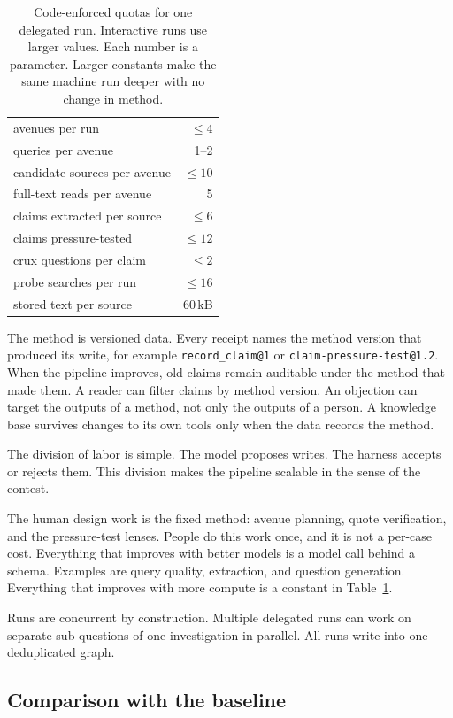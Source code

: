 \documentclass[10pt,twocolumn]{article}
\newcommand{\code}[1]{\texttt{\small #1}}
\begin{document}
\begin{table}[t]
\centering\small
\begin{tabular}{@{}lr@{}}
\toprule
avenues per run & $\leq 4$ \\
queries per avenue & 1--2 \\
candidate sources per avenue & $\leq 10$ \\
full-text reads per avenue & 5 \\
claims extracted per source & $\leq 6$ \\
claims pressure-tested & $\leq 12$ \\
crux questions per claim & $\leq 2$ \\
probe searches per run & $\leq 16$ \\
stored text per source & 60\,kB \\
\bottomrule
\end{tabular}
\caption{Code-enforced quotas for one delegated run. Interactive runs use
larger values. Each number is a parameter. Larger constants make the same
machine run deeper with no change in method.}
\label{tab:quotas}
\end{table}

The method is versioned data. Every receipt names the method version that
produced its write, for example \code{record\_claim@1} or
\code{claim-pressure-test@1.2}. When the pipeline improves, old claims
remain auditable under the method that made them. A reader can filter
claims by method version. An objection can target the outputs of a
method, not only the outputs of a person. A knowledge base survives
changes to its own tools only when the data records the method.

The division of labor is simple. The model proposes writes. The harness
accepts or rejects them. This division makes the pipeline scalable in the
sense of the contest.

The human design work is the fixed method: avenue planning, quote
verification, and the pressure-test lenses. People do this work once, and
it is not a per-case cost. Everything that improves with better models is
a model call behind a schema. Examples are query quality, extraction, and
question generation. Everything that improves with more compute is a
constant in Table~\ref{tab:quotas}.

Runs are concurrent by construction. Multiple delegated runs can work on
separate sub-questions of one investigation in parallel. All runs write
into one deduplicated graph.

\subsection{Comparison with the baseline}
\end{document}
